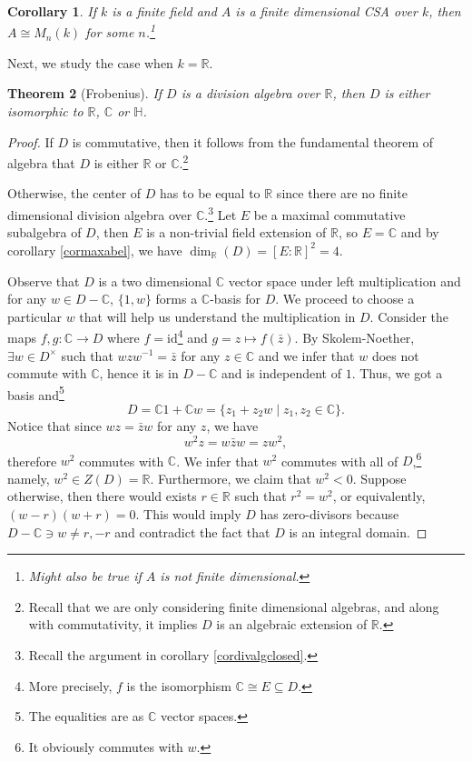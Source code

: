 \documentclass{tufte-handout} %
\newtheorem{thm}{Theorem}
\newtheorem{cor}[thm]{Corollary}
\theoremstyle{definition}
\theoremstyle{remark}
\newcommand{\R}{\mathbb{R}}
\renewcommand{\C}{\mathbb{C}}
\newcommand{\bH}{\mathbb{H}}
\begin{document}
\begin{cor}
	If $k$ is a finite field and $A$ is a finite dimensional CSA over $k$, then $A \cong M_n(k)$ for some $n$.\footnote{Might also be true if $A$ is not finite dimensional.}
\end{cor}
Next, we study the case when $k = \R$.
\begin{thm}[Frobenius]\label{frobenius}
	If $D$ is a division algebra over $\R$, then $D$ is either isomorphic to $\R$, $\C$ or $\bH$.
\end{thm}
\begin{proof}
	If $D$ is commutative, then it follows from the fundamental theorem of algebra that $D$ is either $\R$ or $\C$.\footnote{Recall that we are only considering finite dimensional algebras, and along with commutativity, it implies $D$ is an algebraic extension of $\R$.}
	
	Otherwise, the center of $D$ has to be equal to $\R$ since there are no finite dimensional division algebra over $\C$.\footnote{Recall the argument in corollary \ref{cordivalgclosed}.} Let $E$ be a maximal commutative subalgebra of $D$, then $E$ is a non-trivial field extension of $\R$, so $E = \C$ and by corollary \ref{cormaxabel}, we have $\dim_{\R}(D) = [E:\R]^2 = 4$.
	
	Observe that $D$ is a two dimensional $\C$ vector space under left multiplication and for any $w \in D-\C$, $\{1, w\}$ forms a $\C$-basis for $D$. We proceed to choose a particular $w$ that will help us understand the multiplication in $D$. Consider the maps $f,g: \C \rightarrow D$ where $f = \text{id}$\footnote{More precisely, $f$ is the isomorphism $\C \cong E \subseteq D$.} and $g = z \mapsto f(\bar{z})$. By Skolem-Noether, $\exists w \in D^{\times}$ such that $wzw^{-1} = \bar{z}$ for any $z \in \C$ and we infer that $w$ does not commute with $\C$, hence it is in $D-\C$ and is independent of $1$. Thus, we got a basis and\footnote{The equalities are as $\C$ vector spaces.}
	\[D = \C 1 + \C w = \{z_1 +z_2w \mid z_1, z_2 \in \C\}.\]
	Notice that since $wz = \bar{z}w$ for any $z$, we have
	\[w^2z = w\bar{z}w = zw^2,\] therefore $w^2$ commutes with $\C$. We infer that $w^2$ commutes with all of $D$,\footnote{It obviously commutes with $w$.} namely, $w^2 \in Z(D) = \R$. Furthermore, we claim that $w^2 < 0$. Suppose otherwise, then there would exists $r \in \R$ such that $r^2 = w^2$, or equivalently, $(w-r)(w+r) = 0$. This would imply $D$ has zero-divisors because $D-\C \ni w \neq r,-r$ and contradict the fact that $D$ is an integral domain.
	

\end{proof}
\end{document}
